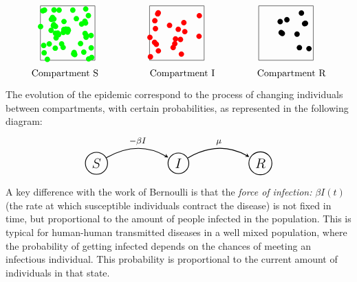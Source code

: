 \[
% 
%         
%         
 \begin{tikzpicture}
        \draw (0,0) rectangle (2cm,2cm);
        \foreach \i in {1,...,50}
            \fill[green] (random*1.9,random*1.9) circle (0.1cm);
        \node at (0.9,-0.5) {Compartment S};
        
        \draw (4,0) rectangle (6cm,2cm);
        \foreach \i in {1,...,20}
            \fill[red] (4+random*1.9,random*1.9) circle (0.1cm);
        \node at (5.2,-0.5) {Compartment I};
        
        \draw (8,0) rectangle (10cm,2cm);
        \foreach \i in {1,...,10}
            \fill[black] (8+random*1.9,random*1.9) circle (0.1cm);
        \node at (9.2,-0.5) {Compartment R};
    \end{tikzpicture}
    \]
The evolution of the epidemic correspond to the process of changing individuals between compartments, with certain probabilities, as represented in the following diagram:
\[
\begin{tikzpicture}[->,>=stealth,shorten >=1pt,auto,node distance=3cm, thick,main node/.style={circle,draw,font=\sffamily\Large\bfseries}]

  \node[main node] (S) {$S$};
  \node[main node] (I) [right of=S] {$I$};
  \node[main node] (R) [right of=I] {$R$};

  \path[every node/.style={font=\sffamily\small}]
    (S) edge [bend left] node [above] {$-\beta I$} (I)
    (I) edge [bend left] node [above] {$\mu$} (R);
\end{tikzpicture}
\]

A key difference with the work of Bernoulli is that the {\it force of infection:} $\beta I(t)$ (the rate at which susceptible individuals contract the disease) is not fixed in time, but proportional to the amount of people infected in the population. This is typical for human-human transmitted diseases in a well mixed population, where the probability of getting infected depends on the chances of meeting an infectious individual. This probability is proportional to the current amount of individuals in that state.


